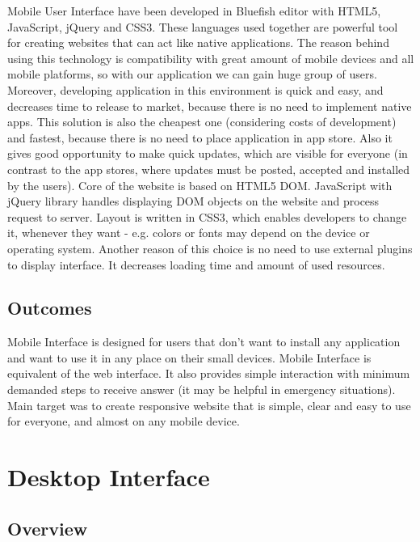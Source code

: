 \documentclass[a4paper,12pt, twocolumn]{article}
\begin{document}
Mobile User Interface have been developed in Bluefish editor with HTML5, JavaScript, jQuery and CSS3. These languages used together are powerful tool for creating websites that can act like native applications. The reason behind using this technology is compatibility with great amount of mobile devices and all mobile platforms, so with our application we can gain huge group of users. Moreover, developing application in this environment is quick and easy, and decreases time to release to market, because there is no need to implement native apps. This solution is also the cheapest one (considering costs of development) and fastest, because there is no need to place application in app store. Also it gives good opportunity to make quick updates, which are visible for everyone (in contrast to the app stores, where updates must be posted, accepted and installed by the users).  
Core of the website is based on HTML5 DOM.  JavaScript with jQuery library handles displaying DOM objects on the website and process request to server. Layout is written in CSS3, which enables developers to change it, whenever they want - e.g. colors or fonts may depend on the device or operating system. Another reason of this choice is no need to use external plugins to display interface. It decreases loading time and amount of used resources.


\subsection*{Outcomes}

Mobile Interface is designed for users that don't want to install any application and want to use it in any place on their small devices. Mobile Interface is equivalent of the web interface. It also provides simple interaction with minimum demanded steps to receive answer (it may be helpful in emergency situations). Main target was to create responsive website that is simple, clear and easy to use for everyone, and almost on any mobile device.


\section*{Desktop Interface}



\subsection*{Overview}
\end{document}
